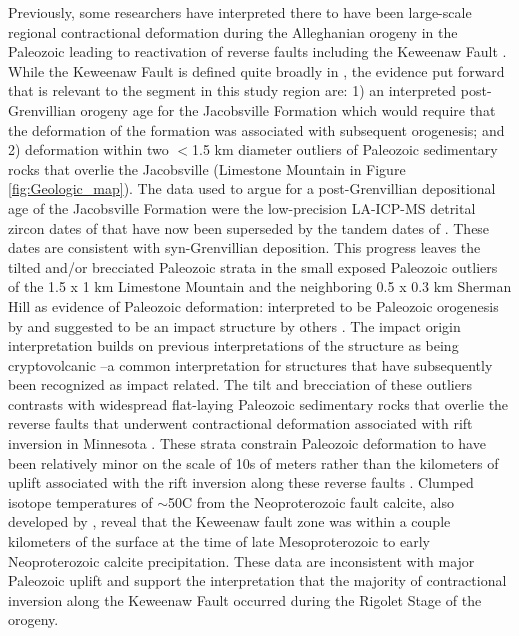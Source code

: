 \documentclass[draft]{agujournal2019}
\begin{document}
Previously, some researchers have interpreted there to have been large-scale regional contractional deformation during the Alleghanian orogeny in the Paleozoic leading to reactivation of reverse faults including the Keweenaw Fault \cite{Craddock2017a}. While the Keweenaw Fault is defined quite broadly in , the evidence put forward that is relevant to the segment in this study region are: 1) an interpreted post-Grenvillian orogeny age for the Jacobsville Formation which would require that the deformation of the formation was associated with subsequent orogenesis; and 2) deformation within two $<$1.5 km diameter outliers of Paleozoic sedimentary rocks that overlie the Jacobsville (Limestone Mountain in Figure \ref{fig:Geologic_map}). The data used to argue for a post-Grenvillian depositional age of the Jacobsville Formation were the low-precision LA-ICP-MS detrital zircon dates of  that have now been superseded by the tandem dates of . These dates are consistent with syn-Grenvillian deposition. This progress leaves the tilted and/or brecciated Paleozoic strata in the small exposed Paleozoic outliers of the 1.5 x 1 km Limestone Mountain and the neighboring 0.5 x 0.3 km Sherman Hill as evidence of Paleozoic deformation: interpreted to be Paleozoic orogenesis by  and suggested to be an impact structure by others \cite{Milstein1987a}. The impact origin interpretation builds on previous interpretations of the structure as being cryptovolcanic \cite{Cannon1981a}--a common interpretation for structures that have subsequently been recognized as impact related. The tilt and brecciation of these outliers contrasts with widespread flat-laying Paleozoic sedimentary rocks that overlie the reverse faults that underwent contractional deformation associated with rift inversion in Minnesota \cite{Jirsa2011a}. These strata constrain Paleozoic deformation to have been relatively minor on the scale of 10s of meters rather than the kilometers of uplift associated with the rift inversion along these reverse faults \cite{Boerboom2018a}. Clumped isotope temperatures of $\sim$50\textdegree C from the Neoproterozoic fault calcite, also developed by , reveal that the Keweenaw fault zone was within a couple kilometers of the surface at the time of late Mesoproterozoic to early Neoproterozoic calcite precipitation. These data are inconsistent with major Paleozoic uplift and support the interpretation that the majority of contractional inversion along the Keweenaw Fault occurred during the Rigolet Stage of the orogeny. 
\end{document}
